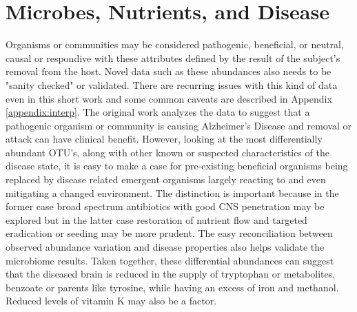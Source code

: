 \documentclass[aps,secnumarabic,balancelastpage,amsmath,amssymb,nofootinbib]{revtex4}
\newcommand{\mjmrefapp}[1]{Appendix   \ref{appendix:#1}}
\begin{document}
\cutibacterium

\staphylococcus

\acidovorax

\noviherbaspirillum

\methylbacterium

\comamonas

\cloacibacterium

\putida

\thermotolerans

\diaphorobacter


\acinetobacter
\tjernbergiae





\section{ Microbes, Nutrients, and Disease }



Organisms or communities may be considered pathogenic,
beneficial, or neutral, causal or respondive 
with these attributes defined by the result of
the subject's removal from the host. 
Novel data such as these abundances also needs to
be "sanity checked" or validated. 
There are recurring issues with this kind of data
even in this short work and some common caveats
are described in \mjmrefapp{interp}.
The original work \cite{10.3389/fcimb.2023.1123228}
 analyzes the data to suggest that  
 a pathogenic organism or community is causing Alzheimer's  Disease
and removal or attack can have clinical benefit. 
However, looking at the most differentially abundant
OTU's, along with other known or suspected characteristics
of the disease state,
 it is easy to make a case for pre-existing beneficial organisms
being replaced by disease related emergent organisms 
largely reacting to and even mitigating a changed environment. 
The distinction is important because in the former case
broad spectrum antibiotics with good CNS penetration may be
explored but in the latter case restoration of nutrient
flow and targeted eradication or seeding may be more prudent.
The easy reconciliation between observed abundance variation
and disease properties also helps validate the microbiome
results. 
Taken together, these  differential abundances
can suggest that
the diseased brain is reduced in the supply
of tryptophan or metabolites, benzoate or parents
like tyrosine, while having an excess of
iron and methanol. 
Reduced levels of vitamin K %
may also be a factor. 
\end{document}
